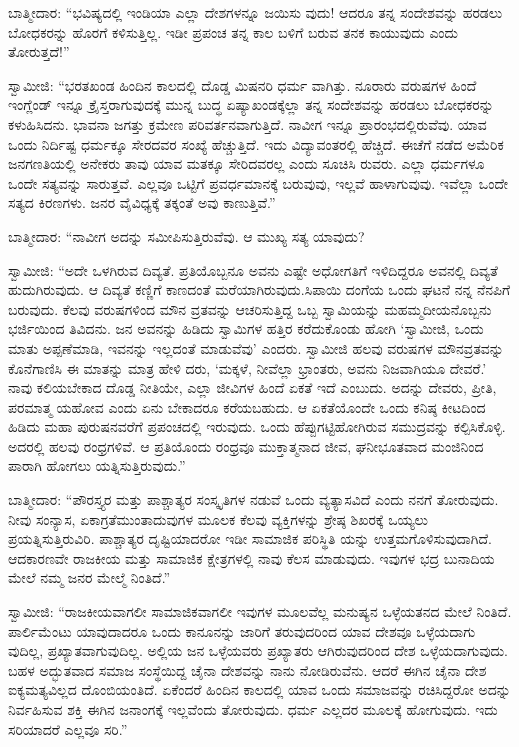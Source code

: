 ಬಾತ್ಮೀದಾರ: “ಭವಿಷ್ಯದಲ್ಲಿ ಇಂಡಿಯಾ ಎಲ್ಲಾ ದೇಶಗಳನ್ನೂ ಜಯಿಸು ವುದು! ಆದರೂ ತನ್ನ ಸಂದೇಶವನ್ನು ಹರಡಲು ಬೋಧಕರನ್ನು ಹೊರಗೆ ಕಳಿಸುತ್ತಿಲ್ಲ. ಇಡೀ ಪ್ರಪಂಚ ತನ್ನ ಕಾಲ ಬಳಿಗೆ ಬರುವ ತನಕ ಕಾಯುವುದು ಎಂದು ತೋರುತ್ತದೆ!”

ಸ್ವಾಮೀಜಿ: “ಭರತಖಂಡ ಹಿಂದಿನ ಕಾಲದಲ್ಲಿ ದೊಡ್ಡ ಮಿಷನರಿ ಧರ್ಮ ವಾಗಿತ್ತು. ನೂರಾರು ವರುಷಗಳ ಹಿಂದೆ ಇಂಗ್ಲೆಂಡ್​ ಇನ್ನೂ ಕ್ರೈಸ್ತರಾಗುವುದಕ್ಕೆ ಮುನ್ನ ಬುದ್ಧ ಏಷ್ಯಾಖಂಡಕ್ಕೆಲ್ಲಾ ತನ್ನ ಸಂದೇಶವನ್ನು ಹರಡಲು ಬೋಧಕರನ್ನು ಕಳುಹಿಸಿದನು. ಭಾವನಾ ಜಗತ್ತು ಕ್ರಮೇಣ ಪರಿವರ್ತನವಾಗುತ್ತಿದೆ. ನಾವೀಗ ಇನ್ನೂ ಪ್ರಾರಂಭದಲ್ಲಿರುವೆವು. ಯಾವ ಒಂದು ನಿರ್ದಿಷ್ಟ ಧರ್ಮಕ್ಕೂ ಸೇರದವರ ಸಂಖ್ಯೆ ಹೆಚ್ಚುತ್ತಿದೆ. ಇದು ವಿದ್ಯಾವಂತರಲ್ಲಿ ಹೆಚ್ಚಿದೆ. ಈಚೆಗೆ ನಡೆದ ಅಮೆರಿಕ ಜನಗಣತಿಯಲ್ಲಿ ಅನೇಕರು ತಾವು ಯಾವ ಮತಕ್ಕೂ ಸೇರಿದವರಲ್ಲ ಎಂದು ಸೂಚಿಸಿ ರುವರು. ಎಲ್ಲಾ ಧರ್ಮಗಳೂ ಒಂದೇ ಸತ್ಯವನ್ನು ಸಾರುತ್ತವೆ. ಎಲ್ಲವೂ ಒಟ್ಟಿಗೆ ಪ್ರವರ್ಧಮಾನಕ್ಕೆ ಬರುವುವು, ಇಲ್ಲವೆ ಹಾಳಾಗುವುವು. ಇವೆಲ್ಲಾ ಒಂದೇ ಸತ್ಯದ ಕಿರಣಗಳು. ಜನರ ವೈವಿಧ್ಯಕ್ಕೆ ತಕ್ಕಂತೆ ಅವು ಕಾಣುತ್ತಿವೆ.”

ಬಾತ್ಮೀದಾರ: “ನಾವೀಗ ಅದನ್ನು ಸಮೀಪಿಸುತ್ತಿರುವೆವು. ಆ ಮುಖ್ಯ ಸತ್ಯ ಯಾವುದು?

ಸ್ವಾಮೀಜಿ: “ಅದೇ ಒಳಗಿರುವ ದಿವ್ಯತೆ. ಪ್ರತಿಯೊಬ್ಬನೂ ಅವನು ಎಷ್ಟೇ ಅಧೋಗತಿಗೆ ಇಳಿದಿದ್ದರೂ ಅವನಲ್ಲಿ ದಿವ್ಯತೆ ಹುದುಗಿರುವುದು. ಆ ದಿವ್ಯತೆ ಕಣ್ಣಿಗೆ ಕಾಣದಂತೆ ಮರೆಯಾಗಿರುವುದು.ಸಿಪಾಯಿ ದಂಗೆಯ ಒಂದು ಘಟನೆ ನನ್ನ ನೆನಪಿಗೆ ಬರುವುದು. ಕೆಲವು ವರುಷಗಳಿಂದ ಮೌನ ವ್ರತವನ್ನು ಆಚರಿಸುತ್ತಿದ್ದ ಒಬ್ಬ ಸ್ವಾಮಿಯನ್ನು ಮಹಮ್ಮದೀಯನೊಬ್ಬನು ಭರ್ಜಿಯಿಂದ ತಿವಿದನು. ಜನ ಅವನನ್ನು ಹಿಡಿದು ಸ್ವಾಮಿಗಳ ಹತ್ತಿರ ಕರೆದುಕೊಂಡು ಹೋಗಿ ‘ಸ್ವಾಮೀಜಿ, ಒಂದು ಮಾತು ಅಪ್ಪಣೆಮಾಡಿ, ಇವನನ್ನು ಇಲ್ಲದಂತೆ ಮಾಡುವೆವು’ ಎಂದರು. ಸ್ವಾಮೀಜಿ ಹಲವು ವರುಷಗಳ ಮೌನವ್ರತವನ್ನು ಕೊನೆಗಾಣಿಸಿ ಈ ಮಾತನ್ನು ಮಾತ್ರ ಹೇಳಿ ದರು, ‘ಮಕ್ಕಳೆ, ನೀವೆಲ್ಲಾ ಭ್ರಾಂತರು, ಅವನು ನಿಜವಾಗಿಯೂ ದೇವರೆ.’ ನಾವು ಕಲಿಯಬೇಕಾದ ದೊಡ್ಡ ನೀತಿಯೇ, ಎಲ್ಲಾ ಜೀವಿಗಳ ಹಿಂದೆ ಏಕತೆ ಇದೆ ಎಂಬುದು. ಅದನ್ನು ದೇವರು, ಪ್ರೀತಿ, ಪರಮಾತ್ಮ ಯಹೋವ ಎಂದು ಏನು ಬೇಕಾದರೂ ಕರೆಯಬಹುದು. ಆ ಏಕತೆಯೊಂದೇ ಒಂದು ಕನಿಷ್ಠ ಕೀಟದಿಂದ ಹಿಡಿದು ಮಹಾ ಪುರುಷನವರೆಗೆ ಪ್ರಪಂಚದಲ್ಲಿ ಇರುವುದು. ಒಂದು ಹೆಪ್ಪುಗಟ್ಟಿಹೋಗಿರುವ ಸಮುದ್ರವನ್ನು ಕಲ್ಪಿಸಿಕೊಳ್ಳಿ. ಅದರಲ್ಲಿ ಹಲವು ರಂಧ್ರಗಳಿವೆ. ಆ ಪ್ರತಿಯೊಂದು ರಂಧ್ರವೂ ಮುಕ್ತಾತ್ಮನಾದ ಜೀವ, ಘನೀಭೂತವಾದ ಮಂಜಿನಿಂದ ಪಾರಾಗಿ ಹೋಗಲು ಯತ್ನಿಸುತ್ತಿರುವುದು.”

ಬಾತ್ಮೀದಾರ: “ಪೌರಸ್ತ್ಯರ ಮತ್ತು ಪಾಶ್ಚಾತ್ಯರ ಸಂಸ್ಕೃತಿಗಳ ನಡುವೆ ಒಂದು ವ್ಯತ್ಯಾಸವಿದೆ ಎಂದು ನನಗೆ ತೋರುವುದು. ನೀವು ಸಂನ್ಯಾಸ, ಏಕಾಗ್ರತೆಮುಂತಾದುವುಗಳ ಮೂಲಕ ಕೆಲವು ವ್ಯಕ್ತಿಗಳನ್ನು ಶ್ರೇಷ್ಠ ಶಿಖರಕ್ಕೆ ಒಯ್ಯಲು ಪ್ರಯತ್ನಿಸುತ್ತಿರುವಿರಿ. ಪಾಶ್ಚಾತ್ಯರ ದೃಷ್ಟಿಯಾದರೋ ಇಡೀ ಸಾಮಾಜಿಕ ಪರಿಸ್ಥಿತಿ ಯನ್ನು ಉತ್ತಮಗೊಳಿಸುವುದಾಗಿದೆ. ಆದಕಾರಣವೇ ರಾಜಕೀಯ ಮತ್ತು ಸಾಮಾಜಿಕ ಕ್ಷೇತ್ರಗಳಲ್ಲಿ ನಾವು ಕೆಲಸ ಮಾಡುವುದು. ಇವುಗಳ ಭದ್ರ ಬುನಾದಿಯ ಮೇಲೆ ನಮ್ಮ ಜನರ ಮೇಲ್ಮೆ ನಿಂತಿದೆ.”

ಸ್ವಾಮೀಜಿ: “ರಾಜಕೀಯವಾಗಲೀ ಸಾಮಾಜಿಕವಾಗಲೀ ಇವುಗಳ ಮೂಲವೆಲ್ಲ ಮನುಷ್ಯನ ಒಳ್ಳೆಯತನದ ಮೇಲೆ ನಿಂತಿದೆ. ಪಾರ್ಲಿಮೆಂಟು ಯಾವುದಾದರೂ ಒಂದು ಕಾನೂನನ್ನು ಜಾರಿಗೆ ತರುವುದರಿಂದ ಯಾವ ದೇಶವೂ ಒಳ್ಳೆಯದಾಗು ವುದಿಲ್ಲ, ಪ್ರಖ್ಯಾತವಾಗುವುದಿಲ್ಲ. ಅಲ್ಲಿಯ ಜನ ಒಳ್ಳೆಯವರು ಪ್ರಖ್ಯಾತರು ಆಗಿರುವುದರಿಂದ ದೇಶ ಒಳ್ಳೆಯದಾಗುವುದು. ಬಹಳ ಅದ್ಭುತವಾದ ಸಮಾಜ ಸಂಸ್ಥೆಯಿದ್ದ ಚೈನಾ ದೇಶವನ್ನು ನಾನು ನೋಡಿರುವೆನು. ಆದರೆ ಈಗಿನ ಚೈನಾ ದೇಶ ಐಕ್ಯಮತ್ಯವಿಲ್ಲದ ದೊಂಬಿಯಂತಿದೆ. ಏಕೆಂದರೆ ಹಿಂದಿನ ಕಾಲದಲ್ಲಿ ಯಾವ ಒಂದು ಸಮಾಜವನ್ನು ರಚಿಸಿದ್ದರೋ ಅದನ್ನು ನಿರ್ವಹಿಸುವ ಶಕ್ತಿ ಈಗಿನ ಜನಾಂಗಕ್ಕೆ ಇಲ್ಲವೆಂದು ತೋರುವುದು. ಧರ್ಮ ಎಲ್ಲದರ ಮೂಲಕ್ಕೆ ಹೋಗುವುದು. ಇದು ಸರಿಯಾದರೆ ಎಲ್ಲವೂ ಸರಿ.”

